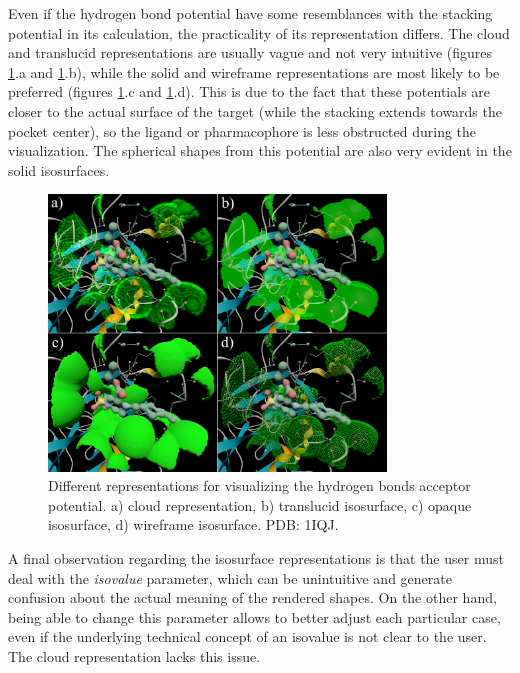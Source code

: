     Even if the hydrogen bond potential have some resemblances with the stacking potential in its calculation, the practicality of its representation differs. The cloud and translucid representations are usually vague and not very intuitive (figures \ref{fig:results/reprs_2}.a and \ref{fig:results/reprs_2}.b), while the solid and wireframe representations are most likely to be preferred (figures \ref{fig:results/reprs_2}.c and \ref{fig:results/reprs_2}.d). This is due to the fact that these potentials are closer to the actual surface of the target (while the stacking extends towards the pocket center), so the ligand or pharmacophore is less obstructed during the visualization. The spherical shapes from this potential are also very evident in the solid isosurfaces.

    \begin{figure}[H]
      \centering
      \includegraphics[width=0.8\textwidth]{figures/results/reprs_2.png}
      \caption{\label{fig:results/reprs_2} Different representations for visualizing the hydrogen bonds acceptor potential. a) cloud representation, b) translucid isosurface, c) opaque isosurface, d) wireframe isosurface. PDB: 1IQJ.}
    \end{figure}

    A final observation regarding the isosurface representations is that the user must deal with the \textit{isovalue} parameter, which can be unintuitive and generate confusion about the actual meaning of the rendered shapes. On the other hand, being able to change this parameter allows to better adjust each particular case, even if the underlying technical concept of an isovalue is not clear to the user. The cloud representation lacks this issue.


